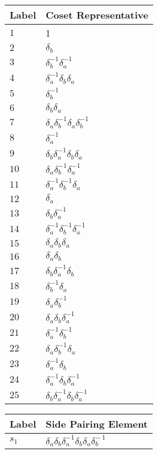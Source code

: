 \documentclass{article}
\begin{document}

\begin{center}
\begin{tabular}{ll}
\toprule
Label & Coset Representative\\
\midrule
$1$ & 1 \\
$2$ & $\delta_b^{}$ \\
$3$ & $\delta_b^{-1}\delta_a^{-1}$ \\
$4$ & $\delta_a^{-1}\delta_b^{}\delta_a^{}$ \\
$5$ & $\delta_b^{-1}$ \\
$6$ & $\delta_b^{}\delta_a^{}$ \\
$7$ & $\delta_a^{}\delta_b^{-1}\delta_a^{}\delta_b^{-1}$ \\
$8$ & $\delta_a^{-1}$ \\
$9$ & $\delta_b^{}\delta_a^{-1}\delta_b^{}\delta_a^{}$ \\
$10$ & $\delta_a^{}\delta_b^{-1}\delta_a^{-1}$ \\
$11$ & $\delta_a^{-1}\delta_b^{-1}\delta_a^{}$ \\
$12$ & $\delta_a^{}$ \\
$13$ & $\delta_b^{}\delta_a^{-1}$ \\
$14$ & $\delta_a^{-1}\delta_b^{-1}\delta_a^{-1}$ \\
$15$ & $\delta_a^{}\delta_b^{}\delta_a^{}$ \\
$16$ & $\delta_a^{}\delta_b^{}$ \\
$17$ & $\delta_b^{}\delta_a^{-1}\delta_b^{}$ \\
$18$ & $\delta_b^{-1}\delta_a^{}$ \\
$19$ & $\delta_a^{}\delta_b^{-1}$ \\
$20$ & $\delta_a^{}\delta_b^{}\delta_a^{-1}$ \\
$21$ & $\delta_a^{-1}\delta_b^{-1}$ \\
$22$ & $\delta_a^{}\delta_b^{-1}\delta_a^{}$ \\
$23$ & $\delta_a^{-1}\delta_b^{}$ \\
$24$ & $\delta_a^{-1}\delta_b^{}\delta_a^{-1}$ \\
$25$ & $\delta_b^{}\delta_a^{-1}\delta_b^{}\delta_a^{-1}$ \\
\bottomrule
\end{tabular}
\hfill
\begin{tabular}{ll}
\toprule
Label & Side Pairing Element\\
\midrule
$s_{1}$ & $\delta_a^{}\delta_b^{}\delta_a^{-1}\delta_b^{}\delta_a^{}\delta_b^{-\
1}$ \\

\end{tabular}
\end{center}
\end{document}
